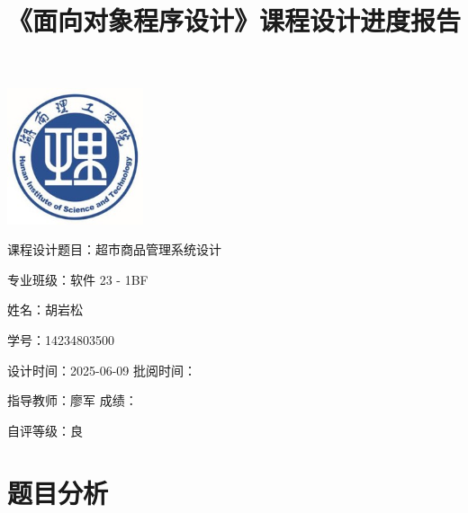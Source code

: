 \documentclass[12pt, a4paper, oneside]{ctexart}
\title{\kaishu\fontsize{24pt}{24pt}\selectfont 《面向对象程序设计》课程设计进度报告}
\date{}
\begin{document}
\maketitle

\vspace{-6em}  %
\centering
\includegraphics[width=0.3\textwidth]{images/湖南理工学院logo..png}

\vspace{2em}
\begin{flushleft}
\songti\fontsize{18pt}{18pt}\selectfont 课程设计题目：超市商品管理系统设计

\vspace{1em}
\songti\fontsize{18pt}{18pt}\selectfont \hspace{2em}专业班级：软件 23 - 1BF

\vspace{1em}
\songti\fontsize{18pt}{18pt}\selectfont \hspace{4em}姓名：胡岩松

\vspace{1em}
\songti\fontsize{18pt}{18pt}\selectfont \hspace{4em}学号：14234803500

\vspace{1em}
\songti\fontsize{18pt}{18pt}\selectfont 设计时间：2025-06-09 \hspace{4em}批阅时间：

\vspace{1em}
\songti\fontsize{18pt}{18pt}\selectfont 指导教师：廖军 \hspace{8em} 成绩：

\vspace{1em}
\songti\fontsize{18pt}{18pt}\selectfont 自评等级：良
\end{flushleft}

\newpage %

\clearpage
\tableofcontents
\clearpage

\newpage %


\section{题目分析}
\end{document}
